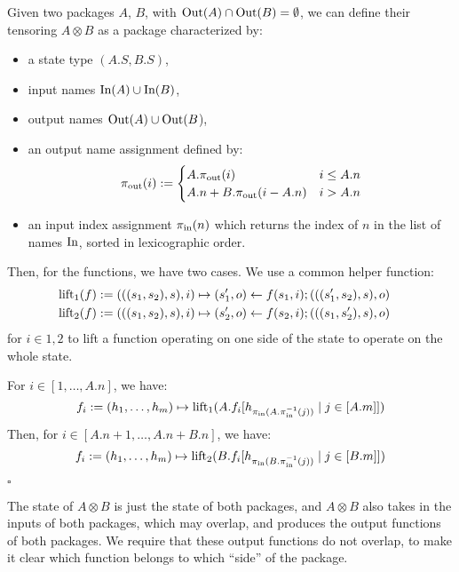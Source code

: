\begin{definition}
    Given two packages $A$, $B$, with $\text{Out}(A) \cap \text{Out}(B) = \emptyset$,
    we can define their tensoring $A \otimes B$ as a package characterized by:
    \begin{itemize}
        \item a state type $(A.S, B.S)$,
        \item input names $\text{In}(A) \cup \text{In}(B)$,
        \item output names $\text{Out}(A) \cup \text{Out}(B$),
        \item an output name assignment defined by:
        $$
        \pi_{\text{out}}(i) := \begin{cases}
            A.\pi_{\text{out}}(i) & i \leq A.n\cr
            A.n + B.\pi_{\text{out}}(i - A.n) & i > A.n
        \end{cases}
        $$
        \item an input index assignment $\pi_{\text{in}}(n)$ which
        returns the index of $n$ in the list of names $\text{In}$, sorted
        in lexicographic order.
    \end{itemize}

    Then, for the functions, we have two cases.
    We use a common helper function:
    $$
    \begin{aligned}
    &\text{lift}_1(f) := (((s_1, s_2), s), i) \mapsto (s'_1, o) \gets f(s_1, i); (((s'_1, s_2), s), o)\cr
    &\text{lift}_2(f) := (((s_1, s_2), s), i) \mapsto (s'_2, o) \gets f(s_2, i); (((s_1, s'_2), s), o)
    \end{aligned}
    $$
    for $i \in {1, 2}$ to lift
    a function operating on one side of the state to operate on the whole state.

    For $i \in [1, \ldots, A.n]$, we have:
    $$
    f_i := (h_1, \ldots, h_m) \mapsto
    \text{lift}_1(A.f_i[h_{\pi_{\text{in}}(A.\pi_{\text{in}}^{-1}(j))}\mid j \in [A.m]])
    $$
    Then, for $i \in [A.n + 1, \ldots, A.n + B.n]$, we have:
    $$
    f_i := (h_1, \ldots, h_m) \mapsto
    \text{lift}_2(B.f_i[h_{\pi_{\text{in}}(B.\pi_{\text{in}}^{-1}(j))}\mid j \in [B.m]])
    $$

    $\square$
\end{definition}

The state of $A \otimes B$ is just the state of both packages,
and $A \otimes B$ also takes in the inputs of both packages,
which may overlap, and produces the output functions of both packages.
We require that these output functions do not overlap, to make
it clear which function belongs to which ``side'' of the package.

